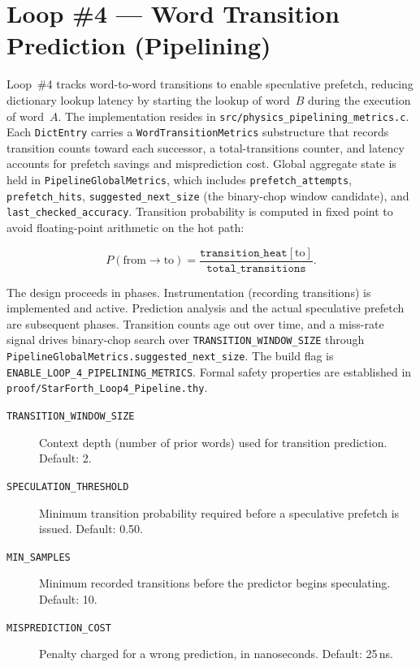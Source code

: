 \section{Loop \#4 --- Word Transition Prediction (Pipelining)}
\label{vol1:sec:physics:loop4}


Loop~\#4 tracks word-to-word transitions to enable speculative prefetch,
reducing dictionary lookup latency by starting the lookup of word~$B$ during
the execution of word~$A$. The implementation resides in
\texttt{src/physics\_pipelining\_metrics.c}. Each \texttt{DictEntry} carries a
\texttt{WordTransitionMetrics} substructure that records transition counts
toward each successor, a total-transitions counter, and \Qtype{} latency
accounts for prefetch savings and misprediction cost. Global aggregate state
is held in \texttt{PipelineGlobalMetrics}, which includes
\texttt{prefetch\_attempts}, \texttt{prefetch\_hits},
\texttt{suggested\_next\_size} (the binary-chop window candidate), and
\texttt{last\_checked\_accuracy}. Transition probability is computed in \Qtype{}
fixed point to avoid floating-point arithmetic on the hot path:

\begin{equation}
  P(\text{from} \rightarrow \text{to})
  = \frac{\mathtt{transition\_heat}[\text{to}]}{\mathtt{total\_transitions}}.
\end{equation}

The design proceeds in phases. Instrumentation (recording transitions) is
implemented and active. Prediction analysis and the actual speculative
prefetch are subsequent phases. Transition counts age out over time, and a
miss-rate signal drives binary-chop search over
\texttt{TRANSITION\_WINDOW\_SIZE} through
\texttt{PipelineGlobalMetrics.suggested\_next\_size}. The build flag is
\texttt{ENABLE\_LOOP\_4\_PIPELINING\_METRICS}. Formal safety properties are
established in \texttt{proof/StarForth\_Loop4\_Pipeline.thy}.

\begin{description}
  \item[\texttt{TRANSITION\_WINDOW\_SIZE}] Context depth (number of prior
    words) used for transition prediction. Default: 2.
  \item[\texttt{SPECULATION\_THRESHOLD}] Minimum transition probability
    required before a speculative prefetch is issued. Default: 0.50.
  \item[\texttt{MIN\_SAMPLES}] Minimum recorded transitions before the
    predictor begins speculating. Default: 10.
  \item[\texttt{MISPREDICTION\_COST}] Penalty charged for a wrong prediction,
    in nanoseconds. Default: 25\,ns.
\end{description}


